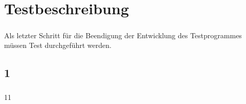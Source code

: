 \chapter{Testbeschreibung}\label{chp:Testbeschreibung}
\paragraph{}
Als letzter Schritt für die Beendigung der Entwicklung des Testprogrammes müssen Test durchgeführt werden. 


\section{1}
\paragraph{}
11